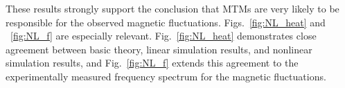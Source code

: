 \documentclass[
 aip,
 amsmath,amssymb,
 reprint
]{revtex4-1}
\begin{document}
These results strongly support the conclusion that MTMs are very likely to be responsible for the observed magnetic fluctuations.  Figs.~\ref{fig:NL_heat} and ~\ref{fig:NL_f} are  especially relevant. Fig.~\ref{fig:NL_heat} demonstrates close agreement between basic theory, linear simulation results, and nonlinear simulation results, and Fig.~\ref{fig:NL_f} extends this agreement to the experimentally measured frequency spectrum for the magnetic fluctuations.   



\end{document}

